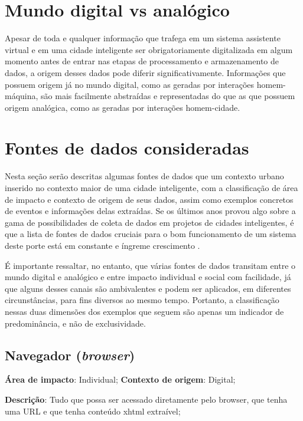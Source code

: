 \section{Mundo digital vs analógico} \label{s:mundo_digital_vs_analogico}

Apesar de toda e qualquer informação que trafega em um sistema assistente virtual e em uma cidade inteligente ser obrigatoriamente digitalizada em algum momento antes de entrar nas etapas de processamento e armazenamento de dados, a origem desses dados pode diferir significativamente. Informações que possuem origem já no mundo digital, como as geradas por interações homem-máquina, são mais facilmente abstraídas e representadas do que as que possuem origem analógica, como as geradas por interações homem-cidade.

\section{Fontes de dados consideradas} \label{s:fontes_de_dados_consideradas}

Nesta seção serão descritas algumas fontes de dados que um contexto urbano inserido no contexto maior de uma cidade inteligente, com a classificação de área de impacto e contexto de origem de seus dados, assim como exemplos concretos de eventos e informações delas extraídas. Se os últimos anos provou algo sobre a gama de possibilidades de coleta de dados em projetos de cidades inteligentes, é que a lista de fontes de dados cruciais para o bom funcionamento de um sistema deste porte está em constante e íngreme crescimento \cite{lavaprotocols:smartcity}.

É importante ressaltar, no entanto, que várias fontes de dados transitam entre o mundo digital e analógico e entre impacto individual e social com facilidade, já que alguns desses canais são ambivalentes e podem ser aplicados, em diferentes circunstâncias, para fins diversos ao mesmo tempo. Portanto, a classificação nessas duas dimensões dos exemplos que seguem são apenas um indicador de predominância, e não de exclusividade.

\subsection{Navegador (\textit{browser})}

\textbf{Área de impacto}: Individual; \textbf{Contexto de origem}: Digital;

\textbf{Descrição}: Tudo que possa ser acessado diretamente pelo browser, que tenha uma URL e que tenha conteúdo xhtml extraível;

